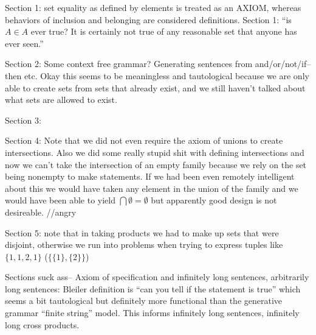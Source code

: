 \documentclass{article}
\newcommand{\nl}[0]{\newline}
\begin{document}
\begin{flushleft}

Section 1: set equality as defined by elements is treated as an AXIOM, whereas behaviors of inclusion and belonging are considered definitions. \nl
Section 1: ``is $A \in A$ ever true? It is certainly not true of any reasonable set that anyone has ever seen.'' \nl

Section 2: Some context free grammar? Generating sentences from and/or/not/if--then etc. \nl
Okay this seems to be meaningless and tautological because we are only able to create sets from sets that already exist, and we still haven't talked about what sets are allowed to exist. \nl

Section 3: \nl

Section 4: Note that we did not even require the axiom of unions to create intersections. Also we did some really stupid shit with defining intersections and now we can't take the intersection of an empty family because we rely on the set being nonempty to make statements. If we had been even remotely intelligent about this we would have taken any element in the union of the family and we would have been able to yield $\bigcap \emptyset = \emptyset$ but apparently good design is not desireable. //angry \nl

Section 5: note that in taking products we had to make up sets that were disjoint, otherwise we run into problems when trying to express tuples like $\{1, 1, 2, 1\}$ ($\{\{1\}, \{2\}\}$)


Sections suck ass-- Axiom of specification and infinitely long sentences, arbitrarily long sentences: Bleiler definition is ``can you tell if the statement is true'' which seems a bit tautological but definitely more functional than the generative grammar ``finite string'' model. This informs infinitely long sentences, infinitely long cross products. 

\end{flushleft}
\end{document}
